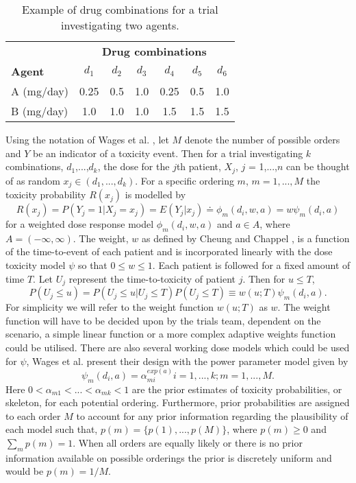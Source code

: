 \begin{table}[h!]
	\centering
	\caption{Example of drug combinations for a trial investigating two agents.}
	\label{tab_adept:ex_drug_combo}
	\begin{tabular}{lcccccc}
		\hline  & \multicolumn{6}{c}{\textbf{Drug combinations}}  \\
		\textbf{Agent} & $d_{1}$ & $d_{2}$ & $d_{3}$ & $d_{4}$ & $d_{5}$ & $d_{6}$ \\ \hline
		A (mg/day) & 0.25 & 0.5 & 1.0 & 0.25 & 0.5 & 1.0         \\
		B (mg/day) & 1.0  & 1.0 & 1.0 & 1.5  & 1.5 & 1.5         \\ \hline
	\end{tabular}
\end{table}

Using the notation of Wages et al. \cite{wagesContinualReassessmentMethod2011,wagesUsingTimetoeventContinual2013}, let $M$ denote the number of possible orders and $Y$ be an indicator of a toxicity event. Then for a trial investigating $k$ combinations, $d_{1}$,...,$d_{k}$, the dose for the $j$th patient, $X_{j}$, $j$ = 1,...,$n$ can be thought of as random $x_{j} \in (d_{1}, ..., d_{k})$. For a specific ordering $m$, $m = 1,...,M$ the toxicity probability $R(x_{j})$ is modelled by 
\begin{equation}
R(x_{j}) = P(Y_{j} = 1 | X_j = x_j) = E(Y_j|x_j) \doteq \phi_m(d_i,w,a) = w\psi_m(d_i,a)
\end{equation}
for  a weighted dose response model $\phi_m(d_i,w,a)$ and $a \in A$, where $A = (-\infty, \infty)$. The weight, $w$ as defined by Cheung and Chappel \cite{cheungSequentialDesignsPhase2000}, is a function of the time-to-event of each patient and is incorporated linearly with the dose toxicity model $\psi$ so that $0 \leq w \leq 1$. Each patient is followed for a fixed amount of time $T$. Let $U_j$ represent the time-to-toxicity of patient $j$. Then for $u \leq T$, 
\begin{equation}
	P(U_j \leq u ) = P(U_j \leq u |U_j \leq T)P(U_j \leq T) \equiv w(u;T) \psi_m(d_i,a).
\end{equation}
For simplicity we will refer to the weight function $w(u;T)$ as $w$. The weight function will have to be decided upon by the trials team, dependent on the scenario, a simple linear function or a more complex adaptive weights function could be utilised. There are also several working dose models which could be used for $\psi$, Wages et al. \cite{wagesUsingTimetoeventContinual2013} present their design with the power parameter model given by 
\begin{equation}
	\psi_m(d_i,a) = \alpha_{mi}^{exp(a)} i = 1,...,k; m = 1,...,M.
\end{equation}
Here $0 < \alpha_{m1} < ... < \alpha_{mk} < 1$ are the prior estimates of toxicity probabilities, or skeleton, for each potential ordering. Furthermore, prior probabilities are assigned to each order $M$ to account for any prior information regarding the plausibility of each model such that, $p(m) = \{p(1),...,p(M)\}$, where $p(m) \geq 0$ and $\sum_mp(m)=1$. When all orders are equally likely or there is no prior information available on possible orderings the prior is discretely uniform and would be $p(m) = 1/M$. 

